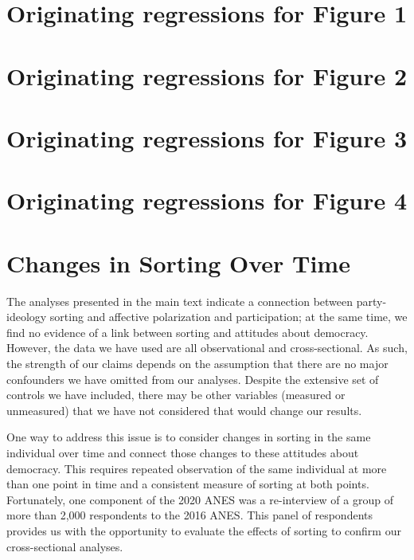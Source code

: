 \documentclass[10pt,landscape]{article}
\begin{document}
\tableofcontents
\listoffigures
\listoftables
\clearpage

\section{Originating regressions for Figure 1}

\clearpage

\section{Originating regressions for Figure 2}

\clearpage

\section{Originating regressions for Figure 3}

\clearpage

\clearpage

\clearpage

\clearpage

\section{Originating regressions for Figure 4}

\clearpage

\clearpage

\clearpage

\clearpage

\section{Changes in Sorting Over Time}
The analyses presented in the main text indicate a connection between party-ideology sorting and affective polarization and participation; at the same time, we find no evidence of a link between sorting and attitudes about democracy.
However, the data we have used are all observational and cross-sectional. 
As such, the strength of our claims depends on the assumption that there are no major confounders we have omitted from our analyses. 
Despite the extensive set of controls we have included, there may be other variables (measured or unmeasured) that we have not considered that would change our results.

One way to address this issue is to consider changes in sorting in the same individual over time and connect those changes to these attitudes about democracy. 
This requires repeated observation of the same individual at more than one point in time and a consistent measure of sorting at both points.
Fortunately, one component of the 2020 ANES was a re-interview of a group of more than 2,000 respondents to the 2016 ANES.
This panel of respondents provides us with the opportunity to evaluate the effects of sorting to confirm our cross-sectional analyses.
\end{document}
